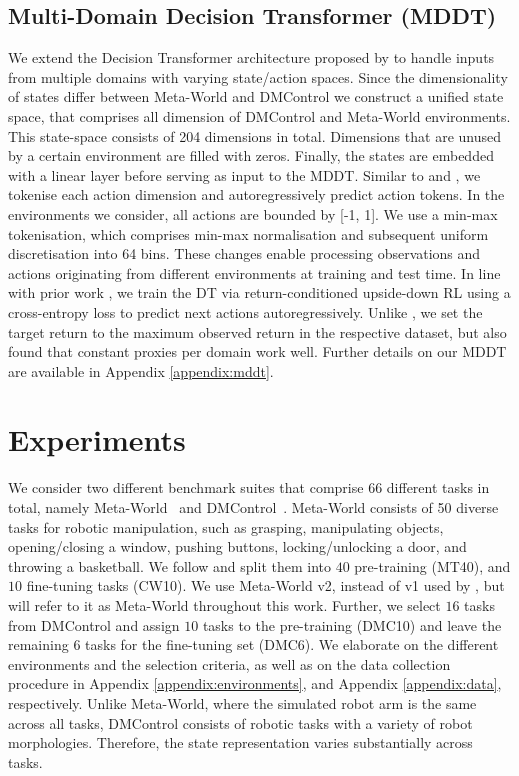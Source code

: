 \documentclass{article}
\begin{document}
\subsection{Multi-Domain Decision Transformer (MDDT)}
We extend the Decision Transformer architecture proposed by \citet{Chen:21} to handle inputs from multiple domains with varying state/action spaces.
Since the dimensionality of states differ between Meta-World and DMControl we construct a unified state space, that comprises all dimension of DMControl and Meta-World environments. This state-space consists of 204 dimensions in total.
Dimensions that are unused by a certain environment are filled with zeros.
Finally, the states are embedded with a linear layer before serving as input to the MDDT.
Similar to \citet{Reed:22} and \citet{Brohan:22}, we tokenise each action dimension and autoregressively predict action tokens. In the environments we consider, all actions are bounded by [-1, 1]. 
We use a min-max tokenisation, which comprises min-max normalisation and subsequent uniform discretisation into 64 bins. 
These changes enable processing observations and actions originating from different environments at training and test time. 
In line with prior work \citep{Chen:21, Lee:22}, we train the DT via return-conditioned upside-down RL using a cross-entropy loss to predict next actions autoregressively.
Unlike \citet{Lee:22}, we set the target return to the maximum observed return in the respective dataset, but also found that constant proxies per domain work well.
Further details on our MDDT are available in Appendix \ref{appendix:mddt}.



\section{Experiments}\label{sec:experiments}
We consider two different benchmark suites that comprise 66 different tasks in total, namely Meta-World~\citep{Yu:22,Wolczyk:21} and DMControl~\citep{Tassa:18}.
Meta-World consists of 50 diverse tasks for robotic manipulation, such as grasping, manipulating objects, opening/closing a window, pushing buttons, locking/unlocking a door, and throwing a basketball. 
We follow \citet{Wolczyk:21} and split them into $40$ pre-training (MT40), and $10$ fine-tuning tasks (CW10). 
We use Meta-World v2, instead of v1 used by \citet{Wolczyk:21}, but will refer to it as Meta-World throughout this work.
Further, we select $16$ tasks from DMControl and assign $10$ tasks to the pre-training (DMC10) and leave the remaining $6$ tasks for the fine-tuning set (DMC6).
We elaborate on the different environments and the selection criteria, as well as on the data collection procedure in Appendix \ref{appendix:environments}, and Appendix \ref{appendix:data}, respectively.
Unlike Meta-World, where the simulated robot arm is the same across all tasks, DMControl consists of robotic tasks with a variety of robot morphologies.
Therefore, the state representation varies substantially across tasks.
\end{document}
